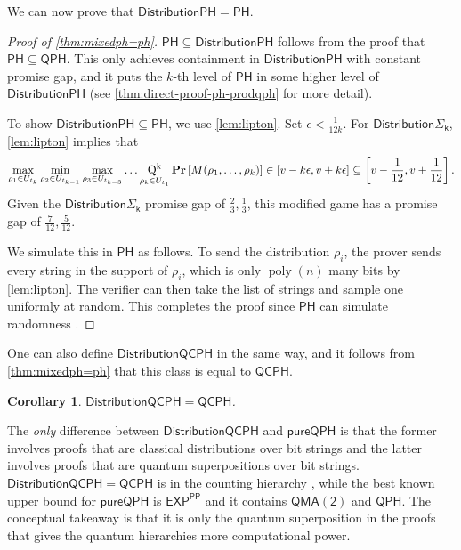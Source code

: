\documentclass[10pt,a4paper]{article}
\newtheorem{corollary}[theorem]{Corollary}
\theoremstyle{definition}
\renewcommand{\Pr}{\mathop{\bf Pr\/}}
\DeclareMathOperator{\poly}{poly}
\newcommand{\class}[1]{\ensuremath{\mathsf{#1}}\xspace}
\newcommand{\EXP}{\class{EXP}}
\newcommand{\QMAk}[1][k]{\class{QMA(#1)}}
\newcommand{\QMAtwo}{\QMAk[2]}
\newcommand{\PP}{\class{PP}}
\newcommand{\PH}{\class{PH}}
\newcommand{\QCPH}{\class{QCPH}}
\newcommand{\QPH}{\class{QPH}}
\newcommand{\pureQPH}{\class{pureQPH}}
\newcommand{\distributionQCPH}{\mathsf{DistributionQCPH}}
\newcommand{\mixedPH}{\class{DistributionPH}}
\newcommand{\mixedSigmai}[1][i]{\mathsf{Distribution\Sigma_{#1}}}
\begin{document}
We can now prove that $\mixedPH = \PH$. 

\begin{proof}[Proof of \cref{thm:mixedph=ph}]
    $\PH \subseteq \mixedPH$ follows from the proof that $\PH\subseteq \QPH$.
    This only achieves containment in $\mixedPH$ with constant promise gap, and it puts the $k$-th level of $\PH$ in some higher level of $\mixedPH$ (see \cref{thm:direct-proof-ph-prodqph} for more detail).
    
    To show $\mixedPH \subseteq \PH$, we use \cref{lem:lipton}.
    Set $\epsilon < \frac{1}{12k}$.
    For $\mixedSigmai[k]$, \cref{lem:lipton} implies that
    \[
        \max_{\rho_1\in U_{t_k}} \min_{\rho_2\in U_{t_{k-1}}} \max_{\rho_3 \in U_{t_{k-3}}} \dots \operatorname*{Q^k}_{\rho_k \in U_{t_1}} \Pr\left[M(\rho_1,\dots,\rho_k)\right] \in [v - k\epsilon, v+k\epsilon] \subseteq \left[v-\frac{1}{12} , v+\frac{1}{12}\right].
    \]
    Given the $\mixedSigmai[k]$ promise gap of $\frac{2}{3},\frac{1}{3}$, this modified game has a promise gap of $\frac{7}{12},\frac{5}{12}$.
    
    We simulate this in $\PH$ as follows. To send the distribution $\rho_i$, the prover sends every string in the support of $\rho_i$, which is only $\poly(n)$ many bits by \cref{lem:lipton}. The verifier can then take the list of strings and sample one uniformly at random. 
    This completes the proof since $\PH$ can simulate randomness \cite{sipser1983complexity, LAUTEMANN1983215}. 
\end{proof}


One can also define $\distributionQCPH$ in the same way, and it follows from \cref{thm:mixedph=ph} that this class is equal to $\QCPH$. 

\begin{corollary}\label{cor:distqcph=qcph}
    $\distributionQCPH = \QCPH$.
\end{corollary}


The \emph{only} difference between $\distributionQCPH$ and $\pureQPH$ is that the former involves proofs that are classical distributions over bit strings and the latter involves proofs that are quantum superpositions over bit strings.
$\distributionQCPH = \QCPH$  is in the counting hierarchy \cite{GSSSY22_qph}, while the best known upper bound for $\pureQPH$ is $\EXP^\PP$ \cite{agarwal2023quantum} and it contains $\QMAtwo$ and $\QPH$.
The conceptual takeaway is that it is only the quantum superposition in the proofs that gives the quantum hierarchies more computational power. 
\end{document}
